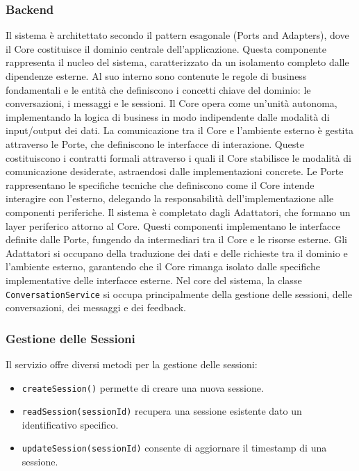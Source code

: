 \subsubsection{Backend}
 Il sistema è architettato secondo il pattern esagonale (Ports and Adapters), dove il Core costituisce il dominio centrale dell'applicazione. Questa componente rappresenta il nucleo del sistema, caratterizzato da un isolamento completo dalle dipendenze esterne. Al suo interno sono contenute le regole di business fondamentali e le entità che definiscono i concetti chiave del dominio: le conversazioni, i messaggi e le sessioni. Il Core opera come un'unità autonoma, implementando la logica di business in modo indipendente dalle modalità di input/output dei dati.
\newline La comunicazione tra il Core e l'ambiente esterno è gestita attraverso le Porte, che definiscono le interfacce di interazione. Queste costituiscono i contratti formali attraverso i quali il Core stabilisce le modalità di comunicazione desiderate, astraendosi dalle implementazioni concrete. Le Porte rappresentano le specifiche tecniche che definiscono come il Core intende interagire con l'esterno, delegando la responsabilità dell'implementazione alle componenti periferiche.
\newline Il sistema è completato dagli Adattatori, che formano un layer periferico attorno al Core. Questi componenti implementano le interfacce definite dalle Porte, fungendo da intermediari tra il Core e le risorse esterne. Gli Adattatori si occupano della traduzione dei dati e delle richieste tra il dominio e l'ambiente esterno, garantendo che il Core rimanga isolato dalle specifiche implementative delle interfacce esterne.
Nel core del sistema, la classe \texttt{ConversationService} si occupa principalmente della gestione delle sessioni, delle conversazioni, dei messaggi e dei feedback.

\subsubsection*{Gestione delle Sessioni}
Il servizio offre diversi metodi per la gestione delle sessioni:
\begin{itemize}
    \item \texttt{createSession()} permette di creare una nuova sessione.
    \item \texttt{readSession(sessionId)} recupera una sessione esistente dato un identificativo specifico.
    \item \texttt{updateSession(sessionId)} consente di aggiornare il timestamp di una sessione.
\end{itemize}

